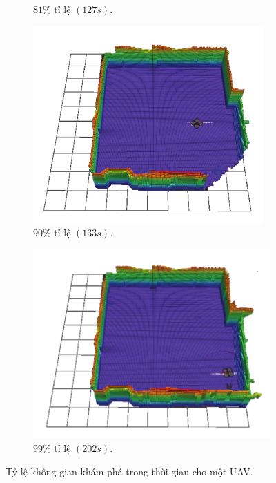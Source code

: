 \documentclass[11pt,openany]{book}
\begin{document}
\begin{algorimth}[H]
\begin{figure}[H]
\begin{subfigure}[H]{0.3\linewidth}
        \caption{{$81\%$ tỉ lệ $(127s).$}}
        \label{fig:3.13h}
    \end{subfigure}
    \begin{subfigure}[H]{0.3\linewidth}
        \centering
        \includegraphics[chiều rộng=\linewidth]{assets/3_13_i.png}
        \caption{{$90\%$ tỉ lệ $(133s).$}}
        \label{fig:3.13i}
    \end{subfigure}
    \begin{subfigure}[H]{0.3\linewidth}
        \includegraphics[chiều rộng=\linewidth]{assets/3_13_j.png}
        \caption{{$99\%$ tỉ lệ $(202s).$}}
        \label{fig:3.13j}
    \end{subfigure}
    \caption{Tỷ lệ không gian khám phá trong thời gian cho một UAV.}
    \label{fig:3.13}
\end{figure}
\begin{figure}[H]
    \centering

\end{figure}
\end{algorimth}
\end{document}
